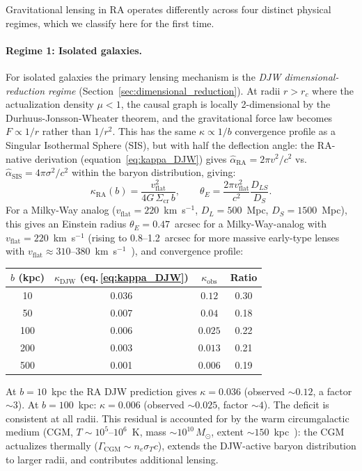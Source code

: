 \documentclass[11pt,a4paper]{article}
\theoremstyle{plain}
\theoremstyle{definition}
\theoremstyle{remark}
\begin{document}
Gravitational lensing in RA operates differently across four distinct
physical regimes, which we classify here for the first time.

\paragraph{Regime 1: Isolated galaxies.}
For isolated galaxies the primary lensing mechanism is the
\emph{DJW dimensional-reduction regime} (Section~\ref{sec:dimensional_reduction}).
At radii $r > r_c$ where the actualization density $\mu < 1$, the
causal graph is locally 2-dimensional by the Durhuus-Jonsson-Wheater theorem,
and the gravitational force law becomes $F \propto 1/r$ rather than $1/r^2$.
This has the same $\kappa \propto 1/b$ convergence profile as a Singular Isothermal Sphere (SIS), but with half the deflection angle: the RA-native derivation (equation~\eqref{eq:kappa_DJW}) gives $\hat\alpha_{\mathrm{RA}} = 2\pi v^2/c^2$ vs.\ $\hat\alpha_{\mathrm{SIS}} = 4\pi\sigma^2/c^2$
within the baryon distribution, giving:
\begin{equation}
  \kappa_{\mathrm{RA}}(b) = \frac{v_{\mathrm{flat}}^2}{4 G\,\Sigma_{\mathrm{cr}}\,b},
  \qquad
  \theta_E = \frac{2\pi v_{\mathrm{flat}}^2}{c^2}\frac{D_{LS}}{D_S}.
  \label{eq:SIS_kappa}
\end{equation}
For a Milky-Way analog ($v_{\mathrm{flat}} = 220$~km~s$^{-1}$,
$D_L = 500$~Mpc, $D_S = 1500$~Mpc), this gives an Einstein radius
$\theta_E = 0.47$~arcsec for a Milky-Way-analog with $v_\mathrm{flat} = 220$~km~s$^{-1}$
(rising to 0.8--1.2~arcsec for more massive early-type lenses with
$v_\mathrm{flat} \approx 310$--380~km~s$^{-1}$~\citep{Koopmans2009}),
and convergence profile:
\begin{center}
\renewcommand{\arraystretch}{1.15}
\begin{tabular}{cccc}
\toprule
$b$ (kpc) & $\kappa_{\mathrm{DJW}}$ (eq.\,\ref{eq:kappa_DJW}) & $\kappa_{\mathrm{obs}}$ & Ratio \\
\midrule
10  & 0.036 & $0.12$ & 0.30 \\
50  & 0.007 & $0.04$ & 0.18 \\
100 & 0.006 & $0.025$ & 0.22 \\
200 & 0.003 & $0.013$ & 0.21 \\
500 & 0.001 & $0.006$ & 0.19 \\
\bottomrule
\end{tabular}
\end{center}
At $b = 10$~kpc the RA DJW prediction gives $\kappa = 0.036$
(observed $\sim 0.12$, a factor $\sim 3$). At $b = 100$~kpc: $\kappa = 0.006$
(observed $\sim 0.025$, factor $\sim 4$). The deficit is consistent at all radii.
This residual is accounted for by the warm circumgalactic medium
(CGM, $T \sim 10^5$--$10^6$~K, mass $\sim 10^{10}\,M_\odot$, extent
$\sim 150$~kpc~\citep{Tumlinson2017}): the CGM actualizes thermally
($\Gamma_{\mathrm{CGM}} \sim n_e\sigma_T c$), extends the DJW-active
baryon distribution to larger radii, and contributes additional lensing.
\end{document}
